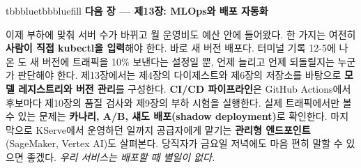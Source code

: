 \vspace{5.0pt}

\begin{calloutbox}{tbbblue}{tbbbluefill}
{\normalsize\bfseries\color{tbbblue}다음 장 — 제13장: MLOps와 배포 자동화}\par\vspace{3pt}
이제 부하에 맞춰 서버 수가 바뀌고 월 운영비도 예산 안에 들어왔다. 한 가지는 여전히 \textbf{사람이 직접 kubectl을 입력}해야 한다. 바로 새 버전 배포다. 터미널 기록 12-5에 나온 도 새 버전에 트래픽을 10\% 보낸다는 설정일 뿐, 언제 늘리고 언제 되돌릴지는 누군가 판단해야 한다. 제13장에서는 제4장의 다이제스트와 제6장의 저장소를 바탕으로 \textbf{모델 레지스트리와 버전 관리}를 구성한다. \textbf{CI/CD 파이프라인}은 GitHub Actions에서 후보마다 제10장의 품질 검사와 제9장의 부하 시험을 실행한다. 실제 트래픽에서만 볼 수 있는 문제는 \textbf{카나리, A/B, 섀도 배포(shadow deployment)}로 확인한다. 마지막으로 KServe에서 운영하던 일까지 공급자에게 맡기는 \textbf{관리형 엔드포인트}(SageMaker, Vertex AI)도 살펴본다. 당직자가 금요일 저녁에도 마음 편히 말할 수 있으면 좋겠다. \textit{우리 서비스는 배포할 때 별일이 없다.}
\end{calloutbox}
